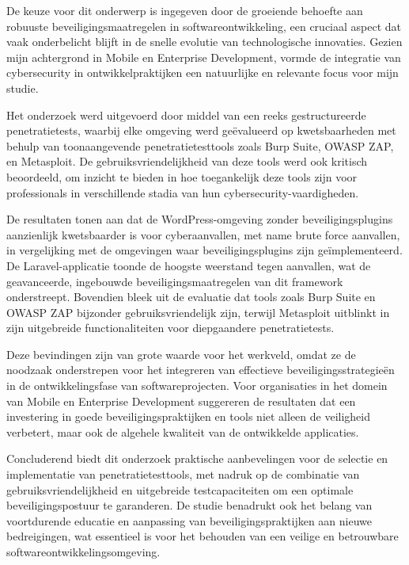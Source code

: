 De keuze voor dit onderwerp is ingegeven door de groeiende behoefte aan robuuste beveiligingsmaatregelen in softwareontwikkeling, een cruciaal 
aspect dat vaak onderbelicht blijft in de snelle evolutie van technologische innovaties. Gezien mijn achtergrond in Mobile en Enterprise 
Development, vormde de integratie van cybersecurity in ontwikkelpraktijken een natuurlijke en relevante focus voor mijn studie.

Het onderzoek werd uitgevoerd door middel van een reeks gestructureerde penetratietests, waarbij elke omgeving werd geëvalueerd op 
kwetsbaarheden met behulp van toonaangevende penetratietesttools zoals Burp Suite, OWASP ZAP, en Metasploit. De gebruiksvriendelijkheid 
van deze tools werd ook kritisch beoordeeld, om inzicht te bieden in hoe toegankelijk deze tools zijn voor professionals in verschillende 
stadia van hun cybersecurity-vaardigheden.

De resultaten tonen aan dat de WordPress-omgeving zonder beveiligingsplugins aanzienlijk kwetsbaarder is voor cyberaanvallen, met name 
brute force aanvallen, in vergelijking met de omgevingen waar beveiligingsplugins zijn geïmplementeerd. De Laravel-applicatie toonde 
de hoogste weerstand tegen aanvallen, wat de geavanceerde, ingebouwde beveiligingsmaatregelen van dit framework onderstreept. 
Bovendien bleek uit de evaluatie dat tools zoals Burp Suite en OWASP ZAP bijzonder gebruiksvriendelijk zijn, terwijl Metasploit 
uitblinkt in zijn uitgebreide functionaliteiten voor diepgaandere penetratietests.

Deze bevindingen zijn van grote waarde voor het werkveld, omdat ze de noodzaak onderstrepen voor het integreren van effectieve 
beveiligingsstrategieën in de ontwikkelingsfase van softwareprojecten. Voor organisaties in het domein van Mobile en Enterprise 
Development suggereren de resultaten dat een investering in goede beveiligingspraktijken en tools niet alleen de veiligheid 
verbetert, maar ook de algehele kwaliteit van de ontwikkelde applicaties.

Concluderend biedt dit onderzoek praktische aanbevelingen voor de selectie en implementatie van penetratietesttools, met 
nadruk op de combinatie van gebruiksvriendelijkheid en uitgebreide testcapaciteiten om een optimale beveiligingspostuur te 
garanderen. De studie benadrukt ook het belang van voortdurende educatie en aanpassing van beveiligingspraktijken aan nieuwe 
bedreigingen, wat essentieel is voor het behouden van een veilige en betrouwbare softwareontwikkelingsomgeving.
